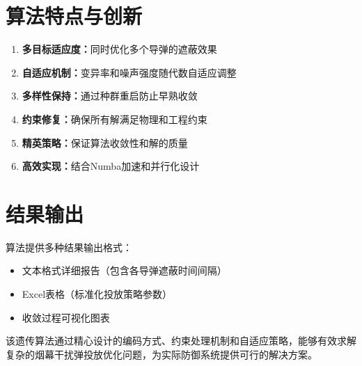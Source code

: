 \documentclass{article}
\begin{document}
\section{算法特点与创新}

\begin{enumerate}
    \item \textbf{多目标适应度：}同时优化多个导弹的遮蔽效果
    \item \textbf{自适应机制：}变异率和噪声强度随代数自适应调整
    \item \textbf{多样性保持：}通过种群重启防止早熟收敛
    \item \textbf{约束修复：}确保所有解满足物理和工程约束
    \item \textbf{精英策略：}保证算法收敛性和解的质量
    \item \textbf{高效实现：}结合Numba加速和并行化设计
\end{enumerate}

\section{结果输出}

算法提供多种结果输出格式：
\begin{itemize}
    \item 文本格式详细报告（包含各导弹遮蔽时间间隔）
    \item Excel表格（标准化投放策略参数）
    \item 收敛过程可视化图表
\end{itemize}

该遗传算法通过精心设计的编码方式、约束处理机制和自适应策略，能够有效求解复杂的烟幕干扰弹投放优化问题，为实际防御系统提供可行的解决方案。
\end{document}
